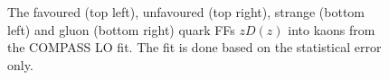 \begin{figure}[!h]
	\caption{The favoured (top left), unfavoured (top right), strange (bottom left) and gluon (bottom right) quark FFs $zD(z)$ into kaons from the COMPASS LO fit. The fit is done based on the statistical error only.}
	\label{pic:FFFit}
\end{figure}
